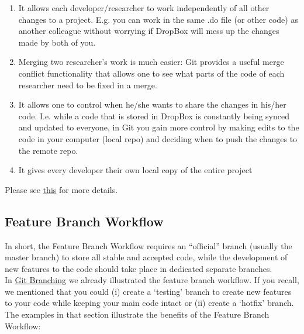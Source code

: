 \documentclass{article}
\begin{document}
\begin{enumerate}
    \item It allows each developer/researcher to work independently of all other changes to a project. E.g. you can work in the same .do file (or other code) as another colleague without worrying if DropBox will mess up the changes made by both of you.
    \item Merging two researcher's work is much easier: Git provides a useful merge conflict functionality that allows one to see what parts of the code of each researcher need to be fixed in a merge. 
    \item It allows one to control when he/she wants to share the changes in his/her code. I.e. while a code that is stored in DropBox is constantly being synced  and updated to everyone, in Git you gain more control by making edits to the code in your computer (local repo) and deciding when to push the changes to the remote repo.
    \item It gives every developer their own local copy of the entire project
\end{enumerate}

Please see \href{https://www.atlassian.com/git/tutorials/comparing-workflows#centralized-workflow}{this} for more details.

\subsection{Feature Branch Workflow}

In short, the Feature Branch Workflow requires an ``official'' branch (usually the master branch) to store all stable and accepted code, while the development of new features to the code should take place in dedicated separate branches. \\
\newline
In \hyperref[sec:branching]{Git Branching} we already illustrated the feature branch workflow. If you recall, we mentioned that you could (i) create a `testing' branch to create new features to your code while keeping your main code intact or (ii) create a `hotfix' branch. The examples in that section illustrate the benefits of the Feature Branch Workflow:
\end{document}
